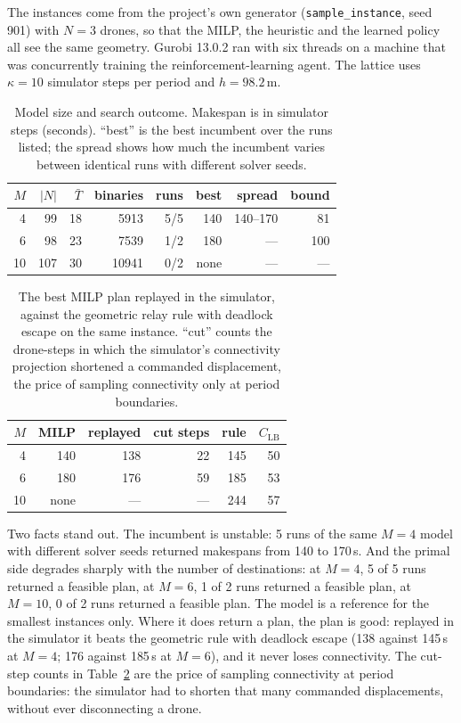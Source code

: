 The instances come from the project's own generator (\texttt{sample\_instance}, seed 901) with $N = 3$ drones, so that the MILP, the heuristic and the learned policy all see the same geometry. Gurobi 13.0.2 ran with six threads on a machine that was concurrently training the reinforcement-learning agent. The lattice uses $\kappa = 10$ simulator steps per period and $h = 98.2$\,m.

\begin{table}[h]
\centering
\caption{Model size and search outcome. Makespan is in simulator steps (seconds). ``best'' is the best incumbent over the runs listed; the spread shows how much the incumbent varies between identical runs with different solver seeds.}
\label{tab:milp}
\begin{tabular}{rrrrrrrr}
\toprule
$M$ & $|N|$ & $\bar{T}$ & binaries & runs & best & spread & bound \\
\midrule
4 & 99 & 18 & 5913 & 5/5 & 140 & 140--170 & 81 \\
6 & 98 & 23 & 7539 & 1/2 & 180 & --- & 100 \\
10 & 107 & 30 & 10941 & 0/2 & none & --- & --- \\
\bottomrule
\end{tabular}
\end{table}

\begin{table}[h]
\centering
\caption{The best MILP plan replayed in the simulator, against the geometric relay rule with deadlock escape on the same instance. ``cut'' counts the drone-steps in which the simulator's connectivity projection shortened a commanded displacement, the price of sampling connectivity only at period boundaries.}
\label{tab:replay}
\begin{tabular}{rrrrrr}
\toprule
$M$ & MILP & replayed & cut steps & rule & $C_{\mathrm{LB}}$ \\
\midrule
4 & 140 & 138 & 22 & 145 & 50 \\
6 & 180 & 176 & 59 & 185 & 53 \\
10 & none & --- & --- & 244 & 57 \\
\bottomrule
\end{tabular}
\end{table}

Two facts stand out. The incumbent is unstable: 5 runs of the same $M = 4$ model with different solver seeds returned makespans from 140 to 170\,s. And the primal side degrades sharply with the number of destinations: at $M = 4$, 5 of 5 runs returned a feasible plan, at $M = 6$, 1 of 2 runs returned a feasible plan, at $M = 10$, 0 of 2 runs returned a feasible plan. The model is a reference for the smallest instances only. Where it does return a plan, the plan is good: replayed in the simulator it beats the geometric rule with deadlock escape (138 against 145\,s at $M = 4$; 176 against 185\,s at $M = 6$), and it never loses connectivity. The cut-step counts in Table~\ref{tab:replay} are the price of sampling connectivity at period boundaries: the simulator had to shorten that many commanded displacements, without ever disconnecting a drone.

